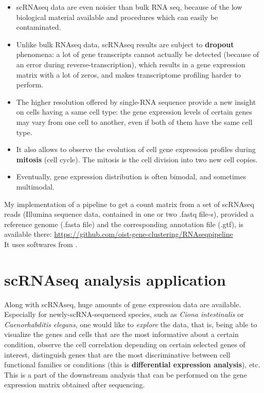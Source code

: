 \documentclass{report}
\begin{document}
\begin{itemize}
\item scRNAseq data are even noisier than bulk RNA seq, because of the low biological material available and procedures which can easily be contaminated\cite{brennecke2013accounting}\cite{grun2014validation}.
\item Unlike bulk RNAseq data, scRNAseq results are subject to \textbf{dropout} phenomena\cite{kharchenko2014bayesian}\cite{lun2016pooling}: a lot of gene transcripts cannot actually be detected (because of an error during reverse-transcription), which results in a gene expression matrix with a lot of zeros, and makes transcriptome profiling harder to perform.
\item The higher resolution offered by single-RNA sequence provide a new insight on cells having a same cell type: the gene expression levels of certain genes may vary from one cell to another\cite{poirion2016single}\cite{martinez2017aging}, even if both of them have the same cell type.
\item It also allows to observe the evolution of cell gene expression profiles during \textbf{mitosis} (cell cycle)\cite{trapnell2014dynamics}. The mitosis is the cell division into two new cell copies.
\item Eventually, gene expression distribution is often bimodal\cite{bessarabova2010bimodal}\cite{mcdavid2014modeling}, and sometimes multimodal\cite{ochab2010bimodal}.

\end{itemize} 

My implementation of a pipeline to get a count matrix from a set of scRNAseq reads (Illumina sequence data, contained in one or two .fastq file-s), provided a reference genome (.fasta file) and the corresponding annotation file (.gtf), is available there: {\url{https://github.com/oist-gene-clustering/RNAseqpipeline}}\\

It uses softwares from \cite{andrews2010fastqc}\cite{bolger2014trimmomatic}\cite{langmead2012fast}\cite{li2009sequence}\cite{pertea2015stringtie}\cite{jiang2016quality}\cite{katayama2013samstrt}\cite{trapnell2012differential}.

\chapter{scRNAseq analysis application}

Along with scRNAseq, huge amounts of gene expression data are available. Especially for newly-scRNA-sequenced species, such as \textit{Ciona intestinalis}\cite{suyama2016singlecell} or \textit{Caenorhabditis elegans}\cite{tintori2016transcriptional}, one would like to \textit{explore} the data, that is, being able to visualize the genes and cells that are the most informative about a certain condition, observe the cell correlation depending on certain selected genes of interest, distinguish genes that are the most discriminative between cell functional families or conditions (this is \textbf{differential expression analysis}), etc. This is a part of the downstream analysis that can be performed on the gene expression matrix obtained after sequencing.
\end{document}
